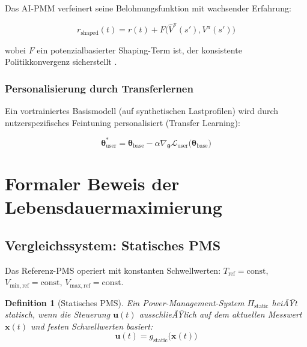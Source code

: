 ﻿\documentclass[12pt,a4paper]{article}
\newtheorem{definition}{Definition}[section]
\begin{document}
	Das AI-PMM verfeinert seine Belohnungsfunktion mit wachsender Erfahrung:
	
	\begin{equation}
		r_\mathrm{shaped}(t) = r(t) + F\bigl(\hat{V}^\pi(s'), V^\pi(s')\bigr)
		\label{eq:reward_shaping}
	\end{equation}
	
	wobei $F$ ein potenzialbasierter Shaping-Term ist, der konsistente
	Politikkonvergenz sicherstellt \cite{Ng1999}.
	
	\subsubsection{Personalisierung durch Transferlernen}
	
	Ein vortrainiertes Basismodell (auf synthetischen Lastprofilen) wird durch
	nutzerspezifisches Feintuning personalisiert (Transfer Learning):
	
	\begin{equation}
		\boldsymbol{\theta}^*_\mathrm{user} = \boldsymbol{\theta}_\mathrm{base}
		- \alpha \nabla_{\boldsymbol{\theta}} \mathcal{L}_\mathrm{user}
		\bigl(\boldsymbol{\theta}_\mathrm{base}\bigr)
		\label{eq:fine_tuning}
	\end{equation}
	
	\section{Formaler Beweis der Lebensdauermaximierung}
	\label{sec:beweis}
	
	\subsection{Vergleichssystem: Statisches PMS}
	
	Das Referenz-PMS operiert mit konstanten Schwellwerten:
	$T_\mathrm{ref} = \mathrm{const}$, $V_\mathrm{min,ref} = \mathrm{const}$,
	$V_\mathrm{max,ref} = \mathrm{const}$.
	
	\begin{definition}[Statisches PMS]
		Ein Power-Management-System $\Pi_\mathrm{static}$ heiÃŸt statisch, wenn
		die Steuerung $\mathbf{u}(t)$ ausschlieÃŸlich auf dem aktuellen Messwert
		$\mathbf{x}(t)$ und festen Schwellwerten basiert:
		\begin{equation}
			\mathbf{u}(t) = g_\mathrm{static}\bigl(\mathbf{x}(t)\bigr)
		\end{equation}
	\end{definition}
	
\end{document}
